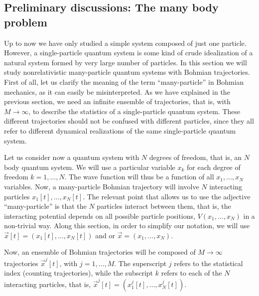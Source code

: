 \documentclass[onecolumn,nofootinbib, secnumarabic, amsmath, nobibnotes,11pt,aps,pra]{revtex4-1}
\begin{document}
\subsection{Preliminary discussions: The many body problem}\label{om.sec_many.1}

Up to now we have only studied a simple system composed of just one
particle. However, a single-particle quantum system is some kind of
crude idealization of a natural system formed by very large number
of particles. In this section we will study nonrelativistic
many-particle quantum systems with Bohmian trajectories. First of
all, let us clarify the meaning of the term ``many-particle'' in
Bohmian mechanics, as it can easily be misinterpreted. As we have
explained in the previous section, we need an infinite ensemble of
trajectories, that is, with $M\rightarrow\infty$, to describe the
statistics of a single-particle quantum system. These different
trajectories should not be confused with different particles, since
they all refer to different dynamical realizations of the same
single-particle quantum system.

Let us consider  now a quantum system with $N$ degrees of freedom,
that is, an $N$ body quantum system. We will use a particular
variable $x_k$ for each degree of freedom $k = 1,\ldots,N$. The wave
function will thus be a function of all $x_{1},\ldots,x_{N}$
variables. Now, a many-particle Bohmian trajectory will involve $N$
interacting particles $x_{1}[t],\ldots,x_{N}[t]$. The relevant point
that allows us to use the adjective ``many-particle'' is that the
$N$ particles interact between them, that is, the interacting
potential depends on all possible particle positions,
$V(x_{1},\ldots,x_{N})$ in a non-trivial way. Along this section, in order to simplify our
notation, we will use $\vec{x}[t] = (x_{1}[t],\ldots,x_{N}[t])$ and or
$\vec{x} = (x_{1},\ldots,x_{N})$.

Now, an ensemble of Bohmian trajectories  will be composed of $M\rightarrow\infty$
trajectories $\vec{x}^j[t]$, with $j = 1,\ldots,M$. The superscript
$j$ refers to the statistical index (counting trajectories), while
the subscript $k$ refers to each of the $N$ interacting particles,
that is, $\vec{x}^j[t] = (x^j_{1}[t],\ldots,x^j_{N}[t] )$.
\end{document}

